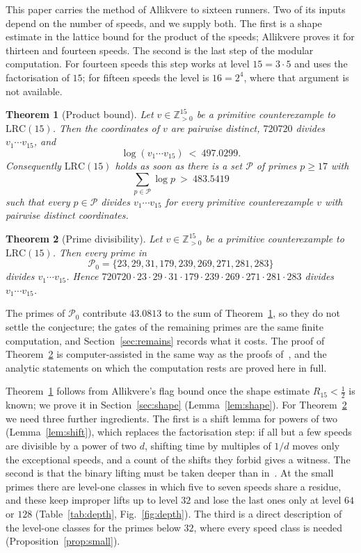 \documentclass[11pt]{amsart}
\newtheorem{theorem}{Theorem}
\theoremstyle{definition}
\theoremstyle{remark}
\newcommand{\Z}{\mathbb{Z}}
\newcommand{\LRC}{\mathrm{LRC}}
\begin{document}
This paper carries the method of Allikvere to sixteen runners. Two of its
inputs depend on the number of speeds, and we supply both. The first is a
shape estimate in the lattice bound for the product of the speeds; Allikvere
proves it for thirteen and fourteen speeds. The second is the last step of
the modular computation. For fourteen speeds this step works at level
$15=3\cdot5$ and uses the factorisation of $15$; for fifteen speeds the
level is $16=2^4$, where that argument is not available.

\begin{theorem}[Product bound]\label{thm:bound}
Let $v\in\Z_{>0}^{15}$ be a primitive counterexample to $\LRC(15)$. Then the
coordinates of $v$ are pairwise distinct, $720720$ divides
$v_1\cdots v_{15}$, and
\[
 \log(v_1\cdots v_{15})\ <\ 497.0299 .
\]
Consequently $\LRC(15)$ holds as soon as there is a set $\mathcal P$ of
primes $p\ge17$ with
\[
 \sum_{p\in\mathcal P}\log p\ >\ 483.5419
\]
such that every $p\in\mathcal P$ divides $v_1\cdots v_{15}$ for every
primitive counterexample $v$ with pairwise distinct coordinates.
\end{theorem}

\begin{theorem}[Prime divisibility]\label{thm:primes}
Let $v\in\Z_{>0}^{15}$ be a primitive counterexample to $\LRC(15)$. Then every
prime in
\[
 \mathcal P_0=\{23,29,31,179,239,269,271,281,283\}
\]
divides $v_1\cdots v_{15}$. Hence
$720720\cdot23\cdot29\cdot31\cdot179\cdot239\cdot269\cdot271\cdot281\cdot283$ divides $v_1\cdots v_{15}$.
\end{theorem}

The primes of $\mathcal P_0$ contribute $43.0813$ to the sum of
Theorem~\ref{thm:bound}, so they do not settle the conjecture; the gates of
the remaining primes are the same finite computation, and
Section~\ref{sec:remains} records what it costs. The proof of
Theorem~\ref{thm:primes} is computer-assisted in the same way as the proofs
of~\cite{ST26,All26}, and the analytic statements on which the computation
rests are proved here in full.

Theorem~\ref{thm:bound} follows from Allikvere's flag bound once the shape
estimate $R_{15}<\frac12$ is known; we prove it in
Section~\ref{sec:shape} (Lemma~\ref{lem:shape}). For
Theorem~\ref{thm:primes} we need three further ingredients. The first is a
shift lemma for powers of two (Lemma~\ref{lem:shift}), which replaces the
factorisation step: if all but a few speeds are divisible by a power of two
$d$, shifting time by multiples of $1/d$ moves only the exceptional speeds,
and a count of the shifts they forbid gives a witness. The second is that
the binary lifting must be taken deeper than in~\cite{All26}. At the small
primes there are level-one classes in which five to seven speeds share a
residue, and these keep improper lifts up to level $32$ and lose the last
ones only at level $64$ or $128$ (Table~\ref{tab:depth},
Fig.~\ref{fig:depth}). The third is a direct description of the level-one
classes for the primes below $32$, where every speed class is needed
(Proposition~\ref{prop:small}).
\end{document}
